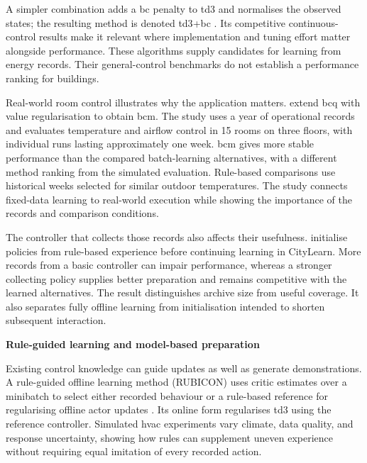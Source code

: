 A simpler combination adds a \gls{bc} penalty to \gls{td3} and normalises the observed states; the resulting method is denoted \acrshort{td3}+\acrshort{bc} \parencite{fujimoto2021td3bc}. Its competitive continuous-control results make it relevant where implementation and tuning effort matter alongside performance. These algorithms supply candidates for learning from energy records. Their general-control benchmarks do not establish a performance ranking for buildings.

Real-world room control illustrates why the application matters. \textcite{liu2022safehvac} extend \gls{bcq} with value regularisation to obtain \gls{bcm}. The study uses a year of operational records and evaluates temperature and airflow control in 15 rooms on three floors, with individual runs lasting approximately one week. \gls{bcm} gives more stable performance than the compared batch-learning alternatives, with a different method ranking from the simulated evaluation. Rule-based comparisons use historical weeks selected for similar outdoor temperatures. The study connects fixed-data learning to real-world execution while showing the importance of the records and comparison conditions.

The controller that collects those records also affects their usefulness. \textcite{nweye2022realworld} initialise policies from rule-based experience before continuing learning in CityLearn. More records from a basic controller can impair performance, whereas a stronger collecting policy supplies better preparation and remains competitive with the learned alternatives. The result distinguishes archive size from useful coverage. It also separates fully offline learning from initialisation intended to shorten subsequent interaction.

\smallskip
\noindent\textbf{Rule-guided learning and model-based preparation}\par\nobreak\smallskip
Existing control knowledge can guide updates as well as generate demonstrations. A rule-guided offline learning method (RUBICON) uses critic estimates over a minibatch to select either recorded behaviour or a rule-based reference for regularising offline actor updates \parencite{liu2023rubicon}. Its online form regularises \gls{td3} using the reference controller. Simulated \gls{hvac} experiments vary climate, data quality, and response uncertainty, showing how rules can supplement uneven experience without requiring equal imitation of every recorded action.

